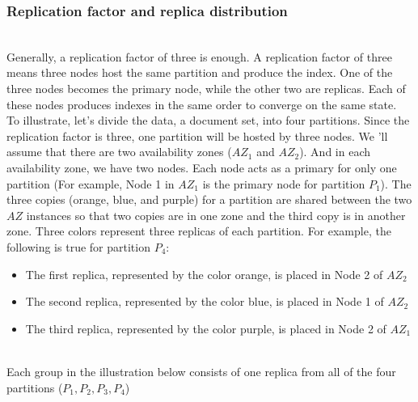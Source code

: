 \subsubsection{Replication factor and replica distribution}\label{ZFS-z8fJKucCYpt2wsswd}
\\
Generally, a replication factor of three is enough. A replication factor of three means three nodes host the same partition and produce the index. One of the three nodes becomes the primary node, while the other two are replicas. Each of these nodes produces indexes in the same order to converge on the same state.
\\
To illustrate, let's divide the data, a document set, into four partitions. Since the replication factor is three, one partition will be hosted by three nodes. We 'll assume that there are two availability zones (\protect{}\label{katex_inline_lkaz1osEyKaw44mD2KtTN}{{{\(AZ_1\)}}}\hspace{0pt} and \protect{}\label{katex_inline_qCdJa_4gsIb_vbsZuQzLw}{{{\(AZ_2\)}}}). And in each availability zone, we have two nodes. Each node acts as a primary for only one partition (For example, Node 1 in \protect{}\label{katex_inline_EFpUeD9JS1ivY8sAJcswz}{{{\(AZ_1\)}}}\hspace{0pt} is the primary node for partition \protect{}\label{katex_inline_MYH6xjjJiM6fSSVRwz5ma}{{{\(P_1\)}}}\hspace{0pt}). The three copies (orange, blue, and purple) for a partition are shared between the two \protect{}\label{katex_inline_KlAwGs1aU8Y79doccaGoS}{{{\(AZ\)}}} instances so that two copies are in one zone and the third copy is in another zone. Three colors represent three replicas of each partition. For example, the following is true for partition \protect{}\label{katex_inline_BTZRz6hN4xiqX84xr89Yh}{{{\(P_4\)}}}:

\begin{itemize}
\item
\protect{}\label{zlQ80a8d4LDeXGeDQBNfV}
The first replica, represented by the color orange, is placed in Node 2 of \protect{}\label{katex_inline_FRVCXkb3mUrZ4EaagzoV8}{{{\(AZ_2​\)}}}
\item
\protect{}\label{infJshPKwzCdYiyxlwhCD}
The second replica, represented by the color blue, is placed in Node 1 of \protect{}\label{katex_inline_dU0OyHZtTBpWfkeIk9iI6}{{{\(AZ_2​\)}}}
\item
\protect{}\label{7YZg6azmKgxUvd6goxuPk}
The third replica, represented by the color purple, is placed in Node 2 of \protect{}\label{katex_inline_ANCS9109ayvrAqaL6cOqT}{{{\(AZ_1\)}}}\hspace{0pt}
\end{itemize}
\\
Each group in the illustration below consists of one replica from all of the four partitions (\protect{}\label{katex_inline_gxzE4LpVcaUzOTiJitBrx}{{{\(P_1, P_2, P_3, P_4\)}}})

